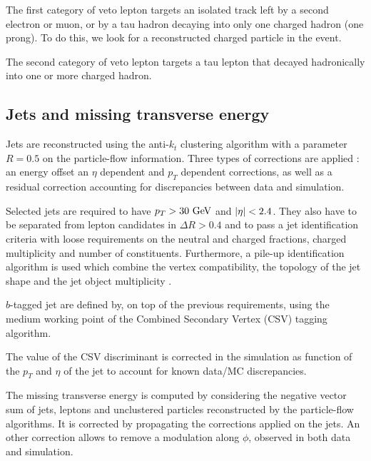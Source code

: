         The first category of veto lepton targets an isolated track left by a second electron or muon, or by a tau hadron
        decaying into only one charged hadron (one prong). To do this, we look for a reconstructed charged particle in the
        event. 

        The second category of veto lepton targets a tau lepton that decayed hadronically into one or more charged hadron.


        \subsection{Jets and missing transverse energy}

       Jets are reconstructed using the anti-$k_t$ clustering algorithm with a parameter $R = 0.5$ on the particle-flow
       information. Three types of corrections are applied : an energy offset an $\eta$ dependent and $p_T$ dependent
       corrections, as well as a residual correction accounting for discrepancies between data and simulation.

       Selected jets are required to have $p_T > 30 ~\text{GeV}$ and $\left| \eta \right| < 2.4$. They also have to be separated from
       lepton candidates in $\Delta R > 0.4$ and to pass a jet identification criteria  with loose
       requirements on the neutral and charged fractions, charged multiplicity and number of constituents. Furthermore,
       a pile-up identification algorithm is used which combine the vertex compatibility, the topology of the jet shape 
       and the jet object multiplicity .

       $b$-tagged jet are defined by, on top of the previous requirements, using the medium working point of the 
       Combined Secondary Vertex (CSV) tagging algorithm. 

       The value of the CSV discriminant is corrected in the simulation as function of the $p_T$ and $\eta$
       of the jet to account for known data/MC discrepancies.

       The missing transverse energy is computed by considering the negative vector sum of jets, leptons and 
       unclustered particles reconstructed by the particle-flow algorithms. It is corrected by propagating the 
       corrections applied on the jets. An other correction allows to remove a modulation along $\phi$, observed 
       in both data and simulation.

